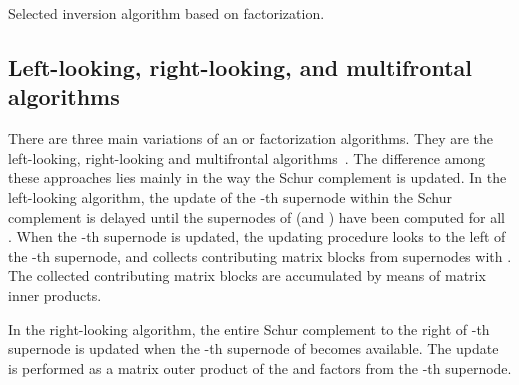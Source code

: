 \documentclass[10pt, conference, compsocconf,letterpaper,twocolumn]{IEEEtran}
\begin{document}
\begin{algorithm}[ht]
  \small
  \DontPrintSemicolon
  \caption{Selected inversion algorithm based on  factorization.}
  \label{alg:selinvlu}




\end{algorithm}


\subsection{Left-looking, right-looking, and multifrontal algorithms}

There are three main variations of an  or  
factorization algorithms. They are the left-looking, right-looking 
and multifrontal
algorithms~\cite{EisenstatSchultzSherman1981,GeorgeHeathLiuEtAl1988,NgPeyton1993,LiDemmel2003,DuffReid1983}.
The difference among these approaches lies mainly in the way the
Schur complement is updated. In the left-looking
algorithm, the update of the -th supernode within the Schur complement
is delayed until the supernodes  of  (and ) have been 
computed for all .  When the -th supernode is updated,
the updating procedure looks to the left of the -th supernode, 
and collects contributing matrix blocks from supernodes  with . 
The collected contributing matrix blocks are accumulated by means of matrix inner products. 

In the right-looking algorithm, the entire Schur complement to the 
right of -th supernode is updated when the -th supernode 
of  becomes available.  The update is performed as a matrix 
outer product of the  and  factors from the -th supernode. 
\end{document}
